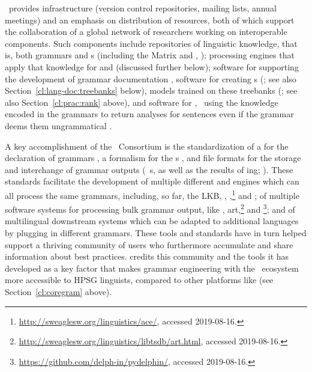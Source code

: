 \documentclass[output=paper,biblatex,babelshorthands,newtxmath,draftmode,colorlinks,citecolor=brown]{langscibook}
\begin{document}
\delphin\ provides infrastructure (version control repositories, mailing lists, annual meetings) and
an emphasis on  distribution of resources, both of which support the collaboration
of a global network of researchers working on interoperable components. Such components include
repositories of linguistic knowledge, that is, both grammars and s (including the
Matrix and , \citealt{Fokkens:14}); processing engines that apply that knowledge for
 and  (discussed further below); software for supporting the
development of grammar documentation
\citep[e.g.,][]{Hashimoto-etal:07}, software for creating s
(\citealt{OFTM2004a-u,Packard:15}; see also Section~\ref{cl:lang-doc:treebanks} below),  models trained on these treebanks (\citealt{Tou:Man:Fli:Oep:05}; see also
Section~\ref{cl:prac:rank} above), and software for , \ie\ using the
knowledge encoded in the grammars to return analyses for sentences even if the grammar deems them
ungrammatical \citep{W11-2923,buys2017parse,chen2018parse}.

A key accomplishment of the \delphin\ Consortium is the standardization of a  for the
declaration of grammars \citep{Copestake:02:CLE}, a formalism for the s
\citep{CFPS2005a}, and file formats for the storage and interchange of
grammar outputs (\eg\ s, as well as the results of ing;
\citealt{Oepen:01,OFTM2004a-u}).  These standards facilitate the development of multiple different
 and  engines which can all process the same grammars, including, so
far, the LKB\indexlkb \citep{Copestake2002a},  \citep{callmeier00},
,\footnote{\url{http://sweaglesw.org/linguistics/ace/}, accessed 2019-08-16.}  and
 \citep{Slayden2012a-u}; of multiple software systems for processing bulk grammar output,
like \itsdb \citep{Oepen:01}, art,\footnote{\url{http://sweaglesw.org/linguistics/libtsdb/art.html}, accessed
  2019-08-16.} and \footnote{\url{https://github.com/delph-in/pydelphin/}, accessed
  2019-08-16.};
and of multilingual downstream systems which can be adapted to additional languages by plugging in
different grammars.  These tools and standards have in turn helped support a thriving community of
users who furthermore accumulate and share information about best practices.
\citet[234]{MelnikHandWritten} credits this community and the tools it has developed as a key factor
that makes grammar engineering with the \delphin\ ecosystem more accessible to HPSG linguists,
compared to other platforms like  (see Section~\ref{cl:coregram} above).
\end{document}
